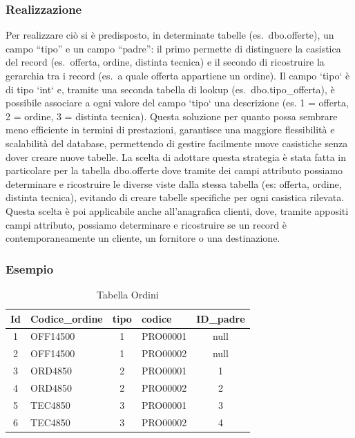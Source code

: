 \documentclass[12pt, a4paper]{article}
\begin{document}
\subsubsection{Realizzazione}
Per realizzare ciò si è predisposto, in determinate tabelle (es.\ dbo.offerte), un campo ``tipo'' e un campo ``padre'': il primo permette di distinguere la casistica del record (es.\ offerta, ordine, distinta tecnica) e il secondo di ricostruire la gerarchia tra i record (es.\ a quale offerta appartiene un ordine).
Il campo `tipo` è di tipo `int` e, tramite una seconda tabella di lookup (es.\ dbo.tipo\_offerta), è possibile associare a ogni valore del campo `tipo` una descrizione (es. 1 = offerta, 2 = ordine, 3 = distinta tecnica).
Questa soluzione per quanto possa sembrare meno efficiente in termini di prestazioni, garantisce una maggiore flessibilità e scalabilità del database,
permettendo di gestire facilmente nuove casistiche senza dover creare nuove tabelle.
La scelta di adottare questa strategia è stata fatta in particolare per la tabella dbo.offerte dove tramite dei campi attributo possiamo determinare e ricostruire le diverse viste dalla stessa tabella (es: offerta, ordine, distinta tecnica),
evitando di creare tabelle specifiche per ogni casistica rilevata.
Questa scelta è poi applicabile anche all'anagrafica clienti, dove, tramite appositi campi attributo, possiamo determinare e ricostruire se un record è contemporaneamente un cliente, un fornitore o una destinazione.
\subsubsection{Esempio}
\begin{table}[h!]
    \centering
    \begin{tabular}{|c|l|c|l|c|}
        \hline
        \textbf{Id} & \textbf{Codice\_ordine} & \textbf{tipo} & \textbf{codice} & \textbf{ID\_padre} \\ \hline
        1           & OFF14500                & 1             & PRO00001        & null               \\ \hline
        2           & OFF14500                & 1             & PRO00002        & null               \\ \hline
        3           & ORD4850                 & 2             & PRO00001        & 1                  \\ \hline
        4           & ORD4850                 & 2             & PRO00002        & 2                  \\ \hline
        5           & TEC4850                 & 3             & PRO00001        & 3                  \\ \hline
        6           & TEC4850                 & 3             & PRO00002        & 4                  \\ \hline
    \end{tabular}
    \vspace{0.5cm}
    \caption{Tabella Ordini}
\end{table}
\end{document}
